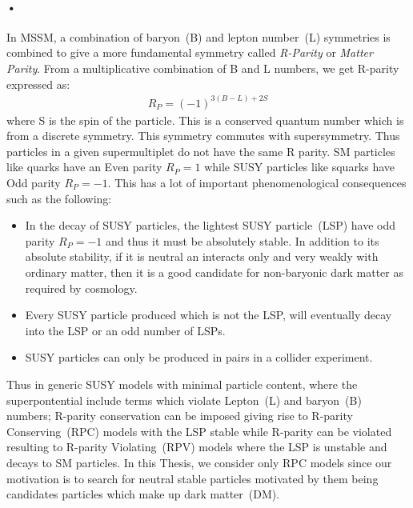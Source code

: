 \paragraph*{•}
In MSSM, a combination of baryon~(B) and lepton number~(L) symmetries is combined to give a more fundamental symmetry called \textit{R-Parity}\cite{RParity} or \textit{Matter Parity}\cite{MParity}.
From a multiplicative combination of B and L numbers, we get R-parity expressed as:
\begin{align}
R_{P} = \left(-1\right)^{3(B-L) + 2S}
\end{align} 
where S is the spin of the particle.
This is a conserved quantum number which is from a discrete symmetry. This symmetry commutes with supersymmetry. Thus particles in a given supermultiplet do not have the same R parity.
SM particles like quarks have an Even parity $R_{P} = 1$ while SUSY particles like squarks have Odd parity $R_{P} = -1$.
This has a lot of important phenomenological consequences such as the following:
\begin{itemize}
\item In the decay of SUSY particles, the lightest SUSY particle~(LSP) have odd parity $R_{P} =-1$ and thus it must be absolutely stable. In addition to its absolute stability, if it is neutral an interacts only and very weakly with ordinary matter, then it is a good candidate for non-baryonic dark matter as required by cosmology.\cite{LSP}
\item Every SUSY particle produced which is not the LSP, will eventually decay into the LSP or an odd number of LSPs.
\item SUSY particles can only be produced in pairs in a collider experiment.
\end{itemize}

Thus in generic SUSY models with minimal particle content, where the superpontential include terms which violate Lepton~(L) and baryon~(B) numbers; R-parity conservation can be imposed giving rise to R-parity Conserving~(RPC) models with the LSP stable while R-parity can be violated resulting to R-parity Violating~(RPV) models where the LSP is unstable and decays to SM particles.
\newline
In this Thesis, we consider only RPC models  since our motivation is to search for neutral stable particles motivated by them being candidates particles which make up dark matter~(DM).
